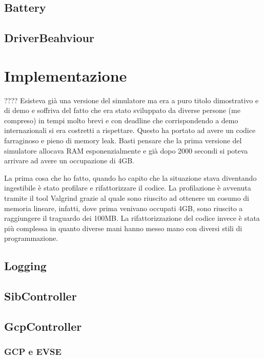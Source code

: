\subsection{Battery}\label{sec:battery}

\subsection{DriverBeahviour}

\section{Implementazione}

????
Esisteva già una versione del simulatore ma era a puro titolo dimostrativo e di demo e soffriva del fatto che era stato sviluppato da diverse persone (me compreso) in tempi molto brevi e con deadline che corrispondendo a demo internazionali si era costretti a rispettare. Questo ha portato ad avere un codice farraginoso e pieno di memory leak. Basti pensare che la prima versione del simulatore allocava RAM esponenzialmente e già dopo 2000 secondi si poteva arrivare ad avere un occupazione di 4GB.

La prima cosa che ho fatto, quando ho capito che la situazione stava diventando ingestibile è stato profilare e rifattorizzare il codice. La profilazione è avvenuta tramite il tool Valgrind grazie al quale sono riuscito ad ottenere un cosumo di memoria lineare, infatti, dove prima venivano occupati 4GB, sono riuscito a raggiungere il traguardo dei 100MB. La rifattorizzazione del codice invece è stata più complessa in quanto diverse mani hanno messo mano con diversi stili di programmazione. 

\subsection{Logging}

\subsection{SibController}

\subsection{GcpController}

\subsubsection{GCP e EVSE}

